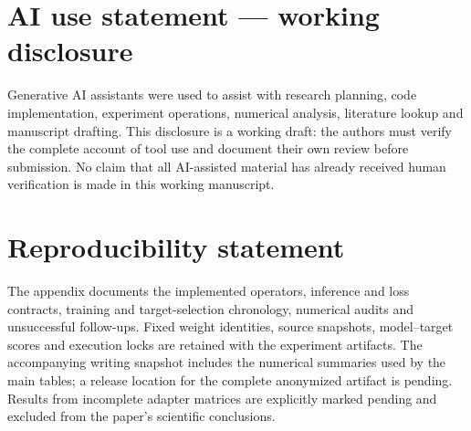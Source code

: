 \section*{AI use statement --- working disclosure}
Generative AI assistants were used to assist with research planning, code
implementation, experiment operations, numerical analysis, literature lookup
and manuscript drafting. This disclosure is a working draft: the authors must
verify the complete account of tool use and document their own review before
submission. No claim that all AI-assisted material has already received human
verification is made in this working manuscript.

\section*{Reproducibility statement}
The appendix documents the implemented operators, inference and loss contracts,
training and target-selection chronology, numerical audits and unsuccessful
follow-ups. Fixed weight identities, source snapshots, model--target scores and
execution locks are retained with the experiment artifacts. The accompanying
writing snapshot includes the numerical summaries used by the main tables;
a release location for the complete anonymized artifact is pending. Results
from incomplete adapter matrices are explicitly marked pending and excluded
from the paper's scientific conclusions.
